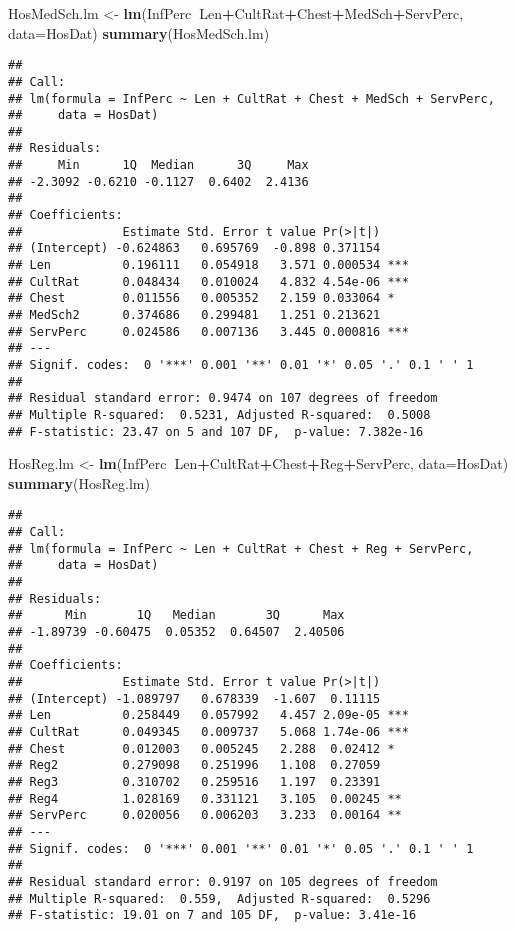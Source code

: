 \documentclass[]{article}
\newenvironment{Shaded}{\begin{snugshade}}{\end{snugshade}}
\newcommand{\KeywordTok}[1]{\textcolor[rgb]{0.13,0.29,0.53}{\textbf{#1}}}
\newcommand{\DataTypeTok}[1]{\textcolor[rgb]{0.13,0.29,0.53}{#1}}
\newcommand{\StringTok}[1]{\textcolor[rgb]{0.31,0.60,0.02}{#1}}
\newcommand{\OperatorTok}[1]{\textcolor[rgb]{0.81,0.36,0.00}{\textbf{#1}}}
\newcommand{\NormalTok}[1]{#1}
\begin{document}
\begin{Shaded}
\begin{Highlighting}[]
\NormalTok{HosMedSch.lm <-}\StringTok{ }\KeywordTok{lm}\NormalTok{(InfPerc}\OperatorTok{~}\NormalTok{Len}\OperatorTok{+}\NormalTok{CultRat}\OperatorTok{+}\NormalTok{Chest}\OperatorTok{+}\NormalTok{MedSch}\OperatorTok{+}\NormalTok{ServPerc, }\DataTypeTok{data=}\NormalTok{HosDat)}
\KeywordTok{summary}\NormalTok{(HosMedSch.lm) }
\end{Highlighting}
\end{Shaded}

\begin{verbatim}
## 
## Call:
## lm(formula = InfPerc ~ Len + CultRat + Chest + MedSch + ServPerc, 
##     data = HosDat)
## 
## Residuals:
##     Min      1Q  Median      3Q     Max 
## -2.3092 -0.6210 -0.1127  0.6402  2.4136 
## 
## Coefficients:
##              Estimate Std. Error t value Pr(>|t|)    
## (Intercept) -0.624863   0.695769  -0.898 0.371154    
## Len          0.196111   0.054918   3.571 0.000534 ***
## CultRat      0.048434   0.010024   4.832 4.54e-06 ***
## Chest        0.011556   0.005352   2.159 0.033064 *  
## MedSch2      0.374686   0.299481   1.251 0.213621    
## ServPerc     0.024586   0.007136   3.445 0.000816 ***
## ---
## Signif. codes:  0 '***' 0.001 '**' 0.01 '*' 0.05 '.' 0.1 ' ' 1
## 
## Residual standard error: 0.9474 on 107 degrees of freedom
## Multiple R-squared:  0.5231, Adjusted R-squared:  0.5008 
## F-statistic: 23.47 on 5 and 107 DF,  p-value: 7.382e-16
\end{verbatim}

\begin{Shaded}
\begin{Highlighting}[]
\NormalTok{HosReg.lm <-}\StringTok{ }\KeywordTok{lm}\NormalTok{(InfPerc}\OperatorTok{~}\NormalTok{Len}\OperatorTok{+}\NormalTok{CultRat}\OperatorTok{+}\NormalTok{Chest}\OperatorTok{+}\NormalTok{Reg}\OperatorTok{+}\NormalTok{ServPerc, }\DataTypeTok{data=}\NormalTok{HosDat)}
\KeywordTok{summary}\NormalTok{(HosReg.lm)}
\end{Highlighting}
\end{Shaded}

\begin{verbatim}
## 
## Call:
## lm(formula = InfPerc ~ Len + CultRat + Chest + Reg + ServPerc, 
##     data = HosDat)
## 
## Residuals:
##      Min       1Q   Median       3Q      Max 
## -1.89739 -0.60475  0.05352  0.64507  2.40506 
## 
## Coefficients:
##              Estimate Std. Error t value Pr(>|t|)    
## (Intercept) -1.089797   0.678339  -1.607  0.11115    
## Len          0.258449   0.057992   4.457 2.09e-05 ***
## CultRat      0.049345   0.009737   5.068 1.74e-06 ***
## Chest        0.012003   0.005245   2.288  0.02412 *  
## Reg2         0.279098   0.251996   1.108  0.27059    
## Reg3         0.310702   0.259516   1.197  0.23391    
## Reg4         1.028169   0.331121   3.105  0.00245 ** 
## ServPerc     0.020056   0.006203   3.233  0.00164 ** 
## ---
## Signif. codes:  0 '***' 0.001 '**' 0.01 '*' 0.05 '.' 0.1 ' ' 1
## 
## Residual standard error: 0.9197 on 105 degrees of freedom
## Multiple R-squared:  0.559,  Adjusted R-squared:  0.5296 
## F-statistic: 19.01 on 7 and 105 DF,  p-value: 3.41e-16
\end{verbatim}
\end{document}
